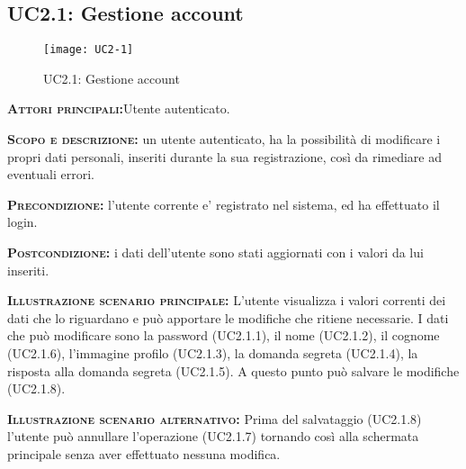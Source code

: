 \subsection{UC2.1: Gestione account}
\begin{figure}[H]
\begin{center}
\texttt{[image: UC2-1]}
\caption{UC2.1: Gestione account}\label{fig:gestione_account}
\end{center}
\end{figure}
\begin{description}
\item{\scshape\bfseries Attori principali:}Utente autenticato.
\item{\scshape\bfseries Scopo e descrizione:} un utente autenticato, ha la possibilità di modificare i propri dati personali, inseriti durante la sua registrazione, così da rimediare ad eventuali errori.
\item{\scshape\bfseries Precondizione:} l'utente corrente e' registrato nel sistema, ed ha effettuato il login.
\item{\scshape\bfseries Postcondizione:} i dati dell'utente sono stati aggiornati con i valori da lui inseriti.
\item{\scshape\bfseries Illustrazione scenario principale:} L'utente visualizza i valori correnti dei dati che lo riguardano e può apportare
le modifiche che ritiene necessarie. I dati che può modificare sono la password (UC2.1.1), il nome (UC2.1.2), il cognome (UC2.1.6), l'immagine profilo (UC2.1.3), la domanda segreta (UC2.1.4), la risposta alla domanda segreta (UC2.1.5). A questo punto può salvare le modifiche (UC2.1.8).
\item{\scshape\bfseries Illustrazione scenario alternativo:} Prima del salvataggio (UC2.1.8) l'utente può annullare l'operazione (UC2.1.7) tornando così alla schermata principale senza aver effettuato nessuna modifica.
\end{description}

